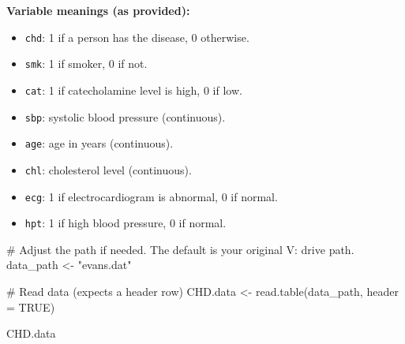 \documentclass[
  letterpaper,
  DIV=11,
  numbers=noendperiod]{scrreprt}
\newenvironment{Shaded}{\begin{snugshade}}{\end{snugshade}}
\newcommand{\AttributeTok}[1]{\textcolor[rgb]{0.40,0.45,0.13}{#1}}
\newcommand{\CommentTok}[1]{\textcolor[rgb]{0.37,0.37,0.37}{#1}}
\newcommand{\ConstantTok}[1]{\textcolor[rgb]{0.56,0.35,0.01}{#1}}
\newcommand{\FunctionTok}[1]{\textcolor[rgb]{0.28,0.35,0.67}{#1}}
\newcommand{\NormalTok}[1]{\textcolor[rgb]{0.00,0.23,0.31}{#1}}
\newcommand{\OtherTok}[1]{\textcolor[rgb]{0.00,0.23,0.31}{#1}}
\newcommand{\StringTok}[1]{\textcolor[rgb]{0.13,0.47,0.30}{#1}}
\providecommand{\tightlist}{%
  \setlength{\itemsep}{0pt}\setlength{\parskip}{0pt}}\usepackage{longtable,booktabs,array}
\begin{document}
\textbf{Variable meanings (as provided):}

\begin{itemize}
\tightlist
\item
  \texttt{chd}: 1 if a person has the disease, 0 otherwise.
\item
  \texttt{smk}: 1 if smoker, 0 if not.
\item
  \texttt{cat}: 1 if catecholamine level is high, 0 if low.
\item
  \texttt{sbp}: systolic blood pressure (continuous).
\item
  \texttt{age}: age in years (continuous).
\item
  \texttt{chl}: cholesterol level (continuous).
\item
  \texttt{ecg}: 1 if electrocardiogram is abnormal, 0 if normal.
\item
  \texttt{hpt}: 1 if high blood pressure, 0 if normal.
\end{itemize}

\begin{Shaded}
\begin{Highlighting}[]
\CommentTok{\# Adjust the path if needed. The default is your original V: drive path.}
\NormalTok{data\_path }\OtherTok{\textless{}{-}} \StringTok{"evans.dat"}

\CommentTok{\# Read data (expects a header row)}
\NormalTok{CHD.data }\OtherTok{\textless{}{-}} \FunctionTok{read.table}\NormalTok{(data\_path, }\AttributeTok{header =} \ConstantTok{TRUE}\NormalTok{)}

\NormalTok{CHD.data}
\end{Highlighting}
\end{Shaded}
\end{document}

